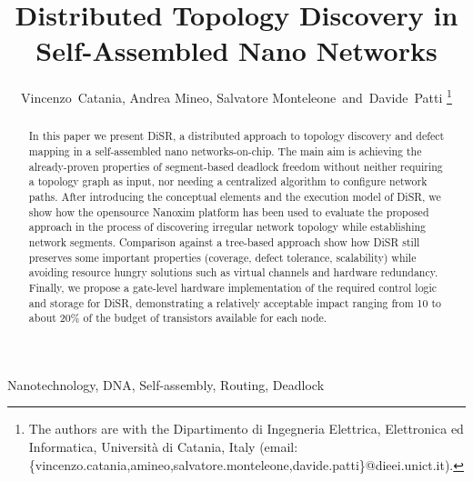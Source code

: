 \documentclass[final,journal]{IEEEtran}
\newcommand{\disr}{{\sf DiSR}}
\begin{document}

\title{Distributed Topology Discovery in Self-Assembled Nano Networks}

\author{Vincenzo~Catania, Andrea Mineo, Salvatore Monteleone~and~Davide~Patti%
\thanks{The authors are with the Dipartimento di Ingegneria
Elettrica, Elettronica ed Informatica, Universit\`a di Catania, Italy
(email: \{vincenzo.catania,amineo,salvatore.monteleone,davide.patti\}@dieei.unict.it).}}

\maketitle


\begin{abstract}
In this paper we present \disr{}, a distributed approach to topology
discovery and defect mapping in a self-assembled nano
networks-on-chip. The main aim is achieving the already-proven
properties of segment-based deadlock freedom without neither requiring
a topology graph as input, nor needing a centralized algorithm to
configure network paths.  After introducing the conceptual elements
and the execution model of \disr{}, we show how the opensource Nanoxim
platform has been used to evaluate the proposed approach in the
process of discovering irregular network topology while establishing
network segments. Comparison against a tree-based approach show how
\disr{} still preserves some important properties (coverage, defect
tolerance, scalability) while avoiding resource hungry solutions such
as virtual channels and hardware redundancy. Finally, we propose a
gate-level hardware implementation of the required control logic and
storage for \disr{}, demonstrating a relatively acceptable impact
ranging from 10 to about 20\% of the budget of transistors available
for each node.
\end{abstract}


\begin{IEEEkeywords}
Nanotechnology, DNA, Self-assembly, Routing, Deadlock
\end{IEEEkeywords}





\end{document}
